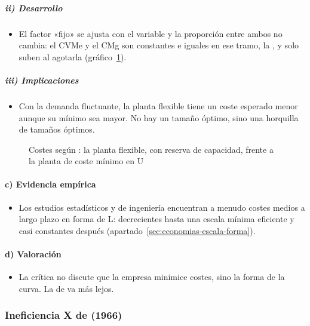 \documentclass[11pt]{article}
\begin{document}
\subparagraph{ii) Desarrollo}

\begin{itemize}
\item El factor «fijo» se ajusta con el variable y la proporción entre ambos no cambia: el CVMe y el CMg son constantes e iguales en ese tramo, la , y solo suben al agotarla (gráfico~\ref{fig:stigler}).
\end{itemize}

\subparagraph{iii) Implicaciones}

\begin{itemize}
\item Con la demanda fluctuante, la planta flexible tiene un coste esperado menor aunque su mínimo sea mayor. No hay un tamaño óptimo, sino una horquilla de tamaños óptimos.
\end{itemize}

\begin{figure}[H]
\centering
\caption{Costes según : la planta flexible, con reserva de capacidad, frente a la planta de coste mínimo en U}\label{fig:stigler}
\end{figure}

\paragraph{c) Evidencia empírica}

\begin{itemize}
\item Los estudios estadísticos y de ingeniería encuentran a menudo costes medios a largo plazo en forma de L: decrecientes hasta una escala mínima eficiente y casi constantes después (apartado~\ref{sec:economias-escala-forma}).
\end{itemize}

\paragraph{d) Valoración}

\begin{itemize}
\item La crítica no discute que la empresa minimice costes, sino la forma de la curva. La de  va más lejos.
\end{itemize}

\subsubsection{Ineficiencia X de  (1966)}\label{sec:ineficiencia-x-leibenstein}
\end{document}
